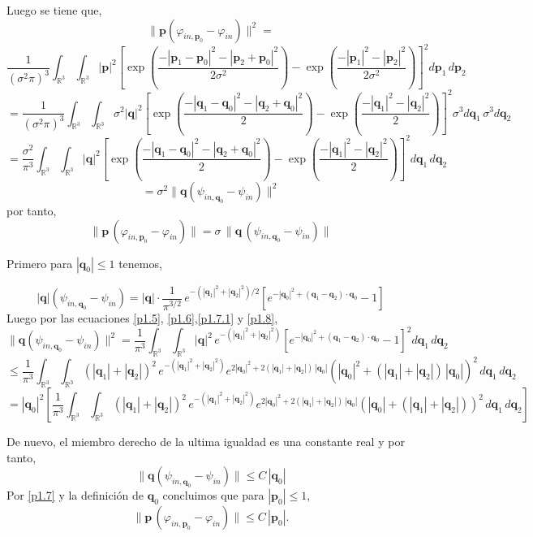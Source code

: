 \documentclass[12pt]{book}
\numberwithin{equation}{chapter}
\def\v{\mathbf}
\def\R{\mathbb{R}}
\def\vp{\varphi}
\def\P{\mathbf{p}}
\begin{document}
Luego se tiene que,
$$ \| \P (\vp_{in,\P_{0}}-\vp_{in}) \|^{2} =$$
$$\frac{1}{(\sigma^{2}\pi)^{3}} \int_{\R^{3}} \int_{\R^{3}} |\P|^{2} \left[ \exp\left(\frac{-|\P_{1}-\P_{0}|^{2}-|\P_{2}+\P_{0}|^{2} }{2\sigma^{2}} \right)-\exp \left(\frac{-|\P_{1}|^{2}-|\P_{2}|^{2}}{2\sigma^{2}} \right) \right]^{2} d\P_{1}\,d\P_{2} $$
$$=\frac{1}{(\sigma^{2}\pi)^{3}} \int_{\R^{3}} \int_{\R^{3}} \sigma^{2}|\v{q}|^{2} \left[ \exp\left(\frac{-|\v{q}_{1}-\v{q}_{0}|^{2}-|\v{q}_{2}+\v{q}_{0}|^{2} }{2} \right)-\exp \left(\frac{-|\v{q}_{1}|^{2}-|\v{q}_{2}|^{2}}{2} \right) \right]^{2} \sigma^{3} d\v{q}_{1}\, \sigma^{3} d\v{q}_{2} $$
$$=  \frac{\sigma^{2}}{\pi^{3}} \int_{\R^{3}} \int_{\R^{3}} |\v{q}|^{2} \left[ \exp\left(\frac{-|\v{q}_{1}-\v{q}_{0}|^{2}-|\v{q}_{2}+\v{q}_{0}|^{2} }{2} \right)-\exp \left(\frac{-|\v{q}_{1}|^{2}-|\v{q}_{2}|^{2}}{2} \right) \right]^{2} d\v{q}_{1}\, d\v{q}_{2} $$
$$= \sigma^{2} \|\v{q} (\psi_{in,\v{q}_{0}}-\psi_{in}) \|^{2}$$
por tanto,
\begin{equation}\label{p1.7}
\| \P\, (\vp_{in,\P_{0}}-\vp_{in}) \|= \sigma \, \|\v{q}\, (\psi_{in,\v{q}_{0}}-\psi_{in}) \|
\end{equation}

Primero para $|\v{q}_{0}|\leq 1$ tenemos,

\begin{equation}\label{p1.8}
|\v{q}|(\psi_{in,\v{q}_{0}}-\psi_{in})=|\v{q}|\cdot \frac{1}{\pi^{3/2}} \, e^{-(|\v{q}_{1}|^{2}+|\v{q}_{2}|^{2})/2} \left[ e^{-|\v{q}_{0}|^{2}+(\v{q}_{1}-\v{q}_{2})\cdot \v{q}_{0} }-1 \right]
\end{equation}
Luego por las ecuaciones \eqref{p1.5}, \eqref{p1.6},\eqref{p1.7.1} y \eqref{p1.8},
$$ \| \v{q}(\psi_{in,\v{q}_{0}}-\psi_{in}) \|^{2}= \frac{1}{\pi^{3}}\int_{\R^{3}} \int_{\R^{3}} |\v{q}|^{2}\, e^{-(|\v{q}_{1}|^{2}+|\v{q}_{2}|^{2})} \left[ e^{-|\v{q}_{0}|^{2}+(\v{q}_{1}-\v{q}_{2})\cdot \v{q}_{0} }-1 \right]^{2} d\v{q}_{1}\, d\v{q}_{2} $$
$$\leq \frac{1}{\pi^{3}}\int_{\R^{3}} \int_{\R^{3}}(|\v{q}_{1}|+|\v{q}_{2}|)^{2} \, e^{-(|\v{q}_{1}|^{2}+|\v{q}_{2}|^{2})} e^{2|\v{q}_{0}|^{2} + 2(|\v{q}_{1}|+|\v{q}_{2}|)\, |\v{q}_{0}|} ( |\v{q}_{0}|^{2} + (|\v{q}_{1}|+|\v{q}_{2}|)\, |\v{q}_{0}| )^{2}  \, d\v{q}_{1}\, d\v{q}_{2} $$
$$= |\v{q}_{0}|^{2} \left[ \frac{1}{\pi^{3}}\int_{\R^{3}} \int_{\R^{3}}(|\v{q}_{1}|+|\v{q}_{2}|)^{2} \, e^{-(|\v{q}_{1}|^{2}+|\v{q}_{2}|^{2})} e^{2|\v{q}_{0}|^{2} + 2(|\v{q}_{1}|+|\v{q}_{2}|)\, |\v{q}_{0}|} ( |\v{q}_{0}| + (|\v{q}_{1}|+|\v{q}_{2}|) )^{2}  \, d\v{q}_{1}\, d\v{q}_{2} \right] $$

De nuevo, el miembro derecho de la ultima igualdad es una constante real y por tanto,
$$ \| \v{q}(\psi_{in,\v{q}_{0}}-\psi_{in}) \| \leq C\, |\v{q}_{0}| $$
Por \eqref{p1.7} y la definici\'on de $\v{q}_{0}$ concluimos que para $|\P_{0}|\leq 1$,
$$ \| \P\, (\vp_{in,\P_{0}}-\vp_{in}) \| \leq C\, |\P_{0}|. $$
\end{document}
